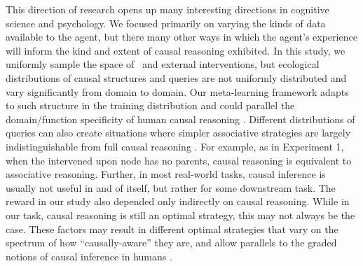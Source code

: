 This direction of research opens up many interesting directions in cognitive science and psychology. We focused primarily on varying the kinds of data available to the agent, but there many other ways in which the agent's experience will inform the kind and extent of causal reasoning exhibited. In this study, we uniformly sample the space of \CBNs~and external interventions, but ecological distributions of causal structures and queries are not uniformly distributed and vary significantly from domain to domain. Our meta-learning framework adapts to such structure in the training distribution \citep{duan2016RL2,ortega2019meta,wang2016} and could parallel the domain/function specificity of human causal reasoning \citep{krynski2007role, lombrozo2010causal}. Different distributions of queries can also create situations where simpler associative strategies are largely indistinguishable from full causal reasoning \citep{todd2007environments, gigerenzer2009homo}. For example, as in Experiment 1, when the intervened upon node has no parents, causal reasoning is equivalent to associative reasoning. Further, in most real-world tasks, causal inference is usually not useful in and of itself, but rather for some downstream task. The reward in our study also depended only indirectly on causal reasoning. While in our task, causal reasoning is still an optimal strategy, this may not always be the case. These factors may result in different optimal strategies that vary on the spectrum of how ``causally-aware'' they are, and allow parallels to the graded notions of causal inference in humans \citep{fernbach2010neglect, fernbach2013cognitive, rehder2014independence, rehder2017failures}. 


